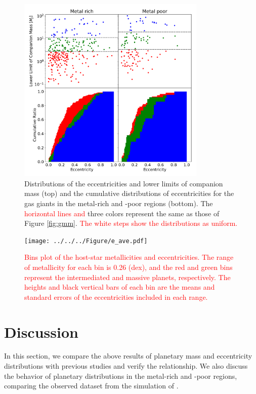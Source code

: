 \documentclass[twocolumn, dvipdfmx]{aastex62}
\def\red<#1>{\textcolor{red}{#1}}
\begin{document}
\begin{CJK*}{UTF8}{min}
\begin{figure}[t]
\begin{center}
\includegraphics[width=9cm]{../../../Figure/e_Mp_merge.pdf}
\caption{Distributions of the eccentricities and lower limits of companion mass (top) and the cumulative distributions of eccentricities for the gas giants in the metal-rich and -poor regions (bottom). The \red<horizontal lines and> three colors represent the same as those of Figure \ref{fig:gmm}. \red<The white steps show the distributions as uniform.> \label{fig:e_Mp}}
\end{center}
\end{figure}

\begin{figure}[t]
\begin{center}
\texttt{[image: ../../../Figure/e\_ave.pdf]}
\caption{\red<Bins plot of the host-star metallicities and eccentricities. The range of metallicity for each bin is 0.26 (dex), and the red and green bins represent the intermediated and massive planets, respectively. The heights and black vertical bars of each bin are the means and standard errors of the eccentricities included in each range.> \label{fig:e_ave}}
\end{center}
\end{figure}


\section{Discussion} \label{sec:discussion}

In this section, we compare the above results of planetary mass and eccentricity distributions with previous studies and verify the relationship. We also discuss the behavior of planetary distributions in the metal-rich and -poor regions, comparing the observed dataset from the simulation of \cite{2012A&A...541A..97M}.



\end{CJK*}
\end{document}
